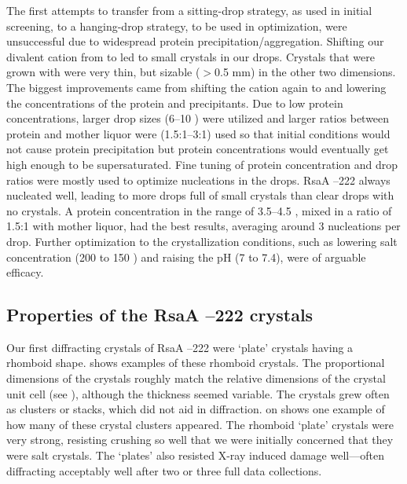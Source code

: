 The first attempts to transfer from a sitting-drop strategy, as used in initial screening, to a hanging-drop strategy, to be used in optimization, were unsuccessful due to widespread protein precipitation/aggregation. Shifting our divalent cation from  to  led to small crystals in our drops. Crystals that were grown with  were very thin, but sizable ($>$0.5 \si{\milli\meter}) in the other two dimensions. The biggest improvements came from shifting the cation again to  and lowering the concentrations of the protein and precipitants. Due to low protein concentrations, larger drop sizes (6--10 \microlitre) were utilized and larger ratios between protein and mother liquor were (1.5:1--3:1) used so that initial conditions would not cause protein precipitation but protein concentrations would eventually get high enough to be supersaturated. Fine tuning of protein concentration and drop ratios were mostly used to optimize nucleations in the drops. RsaA --222 always nucleated well, leading to more drops full of small crystals than clear drops with no crystals. A protein concentration in the range of 3.5--4.5 \mgperml, mixed in a ratio of 1.5:1 with mother liquor, had the best results, averaging around 3 nucleations per drop. Further optimization to the crystallization conditions, such as lowering salt concentration (200 \millimolar to 150 \millimolar) and raising the pH (7 to 7.4), were of arguable efficacy. 

\subsection{Properties of the RsaA --222 crystals}\label{sec:properties-crystals}
Our first diffracting crystals of RsaA --222 were `plate' crystals having a rhomboid shape.   shows examples of these rhomboid crystals. The proportional dimensions of the crystals roughly match the relative dimensions of the crystal unit cell (see ), although the thickness seemed variable. The crystals grew often as clusters or stacks, which did not aid in diffraction.  on  shows one example of how many of these crystal clusters appeared. The rhomboid `plate' crystals were very strong, resisting crushing so well that we were initially concerned that they were salt crystals. The `plates' also resisted X-ray induced damage well---often diffracting acceptably well after two or three full data collections. 

